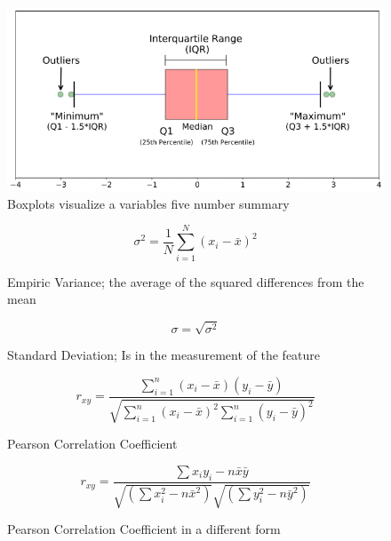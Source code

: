 \documentclass[../Main.tex]{subfiles}
\begin{document}

\begin{figure}[H]
    \centering
    \includegraphics[width=0.5\linewidth]{Images/datan/box-plot.png}
    \caption{Boxplots visualize a variables five number summary}
\end{figure}

\begin{figure}[H]
    \begin{equation}
        \sigma^2 = \frac{1}{N} \sum_{i=1}^{N} (x_i - \bar{x})^2
    \end{equation}
    \caption{Empiric Variance; the average of the squared differences from the mean}
\end{figure}
\begin{figure}[H]
    \begin{equation}
        \sigma = \sqrt{\sigma^2}
    \end{equation}
    \caption{Standard Deviation; Is in the measurement of the feature}
\end{figure}
\begin{figure}[H]
    \begin{equation}
        r_{xy} = \frac{\sum_{i=1}^{n} (x_i - \bar{x}) (y_i - \bar{y})} {\sqrt{\sum_{i=1}^{n} (x_i - \bar{x})^2 \sum_{i=1}^{n}(y_i - \bar{y})^2}}
    \end{equation}
    \caption{Pearson Correlation Coefficient}
\end{figure}
\begin{figure}[H]
    \begin{equation}
        r_{xy} = \frac{\sum x_i y_i - n \bar{x} \bar{y}}{\sqrt{(\sum x_i^2 - n \bar{x}^2)} \sqrt{(\sum y_i^2 - n \bar{y}^2)}}
    \end{equation}
    \caption{Pearson Correlation Coefficient in a different form}
\end{figure}
\end{document}
